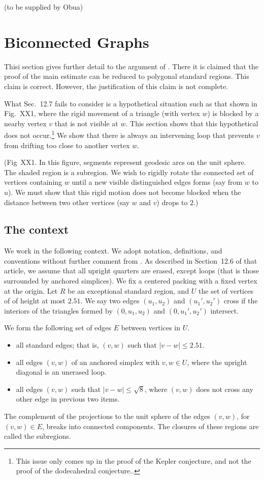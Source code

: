 \documentclass[11pt]{amsart}
\begin{document}
(to be supplied by Obua)



\section{Biconnected Graphs}


Thisi section gives further detail to the argument of \cite[p131,Sec.12.7]{Hales:2006:DCG}.  There it is claimed that
the proof of the main estimate \cite[Theorem~12.1]{Hales:2006:DCG} can be reduced to polygonal standard regions.
This claim is correct.  However, the justification of this claim is not complete.  

What Sec.~12.7 fails to consider
is a hypothetical situation such as that shown in Fig.~XX1, where the rigid movement of a triangle (with vertex $w$)
is blocked by a nearby vertex $v$ that is not visible at $w$.  This section shows that this hypothetical does
not occur.\footnote{This issue only comes up in the proof of the Kepler conjecture, and not
the proof of the dodecahedral conjecture.\cite{Hales:2008:Dodec}.}  We show that there is always an intervening loop
that prevents $v$ from drifting too close to another vertex $w$.

(Fig~XX1.  In this figure, segments represent geodesic arcs on the unit sphere.  The shaded region is a subregion.
We wish to rigidly rotate the connected set of vertices containing $w$ until a new visible distinguished edges forms
(say from $w$ to $u$).  We must show that this rigid motion does not become blocked when the distance between
two other vertices (say $w$ and $v$) drops to $2$.)

\subsection*{The context}

We work in the following context.  We adopt notation, definitions, and conventions without further comment
from \cite{Hales:2006:DCG}.  As described in Section~12.6 of that article, we assume that all upright quarters
are erased, except loops (that is those surrounded by anchored simplices).  We fix a centered packing with
a fixed vertex at the origin.  Let $R$ be an exceptional standard region, and
$U$ the set of vertices of of height at most $2.51$.  We say two edges $(u_1,u_2)$ and $(u_1',u_2')$ cross
if the interiors of the triangles formed by $(0,u_1,u_2)$ and $(0,u_1',u_2')$ intersect.

We form the following set of edges $E$ between vertices in $U$.
\begin{itemize}
\item all standard edges; that is, $(v,w)$ such that $|v-w|\le 2.51$.
\item all edges $(v,w)$ of an anchored simplex with $v,w\in U$, where the upright diagonal is an unerased loop.
\item all edges $(v,w)$ such that $|v-w|\le\sqrt8$, where $(v,w)$ does not cross any other edge in previous two items.
\end{itemize}
The complement of the projections to the unit sphere of the edges $(v,w)$, for $(v,w)\in E$, breaks into
connected components.  The closures of these regions are called the subregions.
\end{document}
